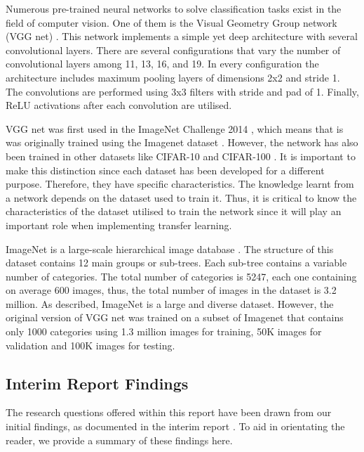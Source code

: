 \documentclass{article}
\begin{document}
Numerous pre-trained neural networks to solve classification tasks exist in the field of computer vision. One of them is the Visual Geometry Group network (VGG net) \cite{DBLP:journals/corr/SimonyanZ14a}. This network implements a simple yet deep architecture with several convolutional layers. There are several configurations that vary the number of convolutional layers among 11, 13, 16, and 19. In every configuration the architecture includes maximum pooling layers of dimensions 2x2 and stride 1. The convolutions are performed using 3x3 filters with stride and pad of 1. Finally, ReLU activations after each convolution are utilised.

VGG net was first used in the ImageNet Challenge 2014 \cite{DBLP:journals/corr/SimonyanZ14a}, which means that is was originally trained using the Imagenet dataset \cite{deng2009imagenet}. However, the network has also been trained in other datasets like CIFAR-10 \cite{krizhevsky2014cifar} and CIFAR-100 \cite{CIFAR-100}. It is important to make this distinction since each dataset has been developed for a different purpose. Therefore, they have specific characteristics. The knowledge learnt from a network depends on the dataset used to train it. Thus, it is critical to know the characteristics of the dataset utilised to train the network since it will play an important role when implementing transfer learning.

ImageNet is a large-scale hierarchical image database \cite{ImageNet}. The structure of this dataset contains 12 main groups or sub-trees. Each sub-tree contains a variable number of categories. The total number of categories is 5247, each one containing on average 600 images, thus, the total number of images in the dataset is 3.2 million. As described, ImageNet is a large and diverse dataset. However, the original version of VGG net was trained on a subset of Imagenet that contains only 1000 categories using 1.3 million images for training, 50K images for validation and 100K images for testing.

\subsection{Interim Report Findings}
\label{sec:findings}

The research questions offered within this report have been drawn from our initial findings, as documented in the interim report \cite{interim-report}. To aid in orientating the reader, we provide a summary of these findings here.
\end{document}
